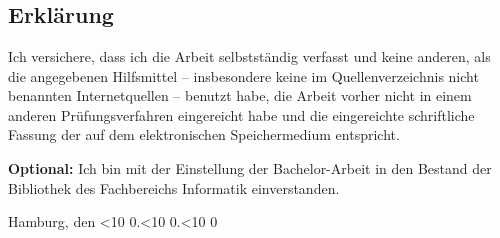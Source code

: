 \documentclass[
	12pt,
	a4paper,
	BCOR10mm,
	DIV14,
	listof=totoc,
	bibliography=totoc,
	headsepline
]{scrreprt}
\newcommand{\leadingzero}[1]{\ifnum #1<10 0\the#1\else\the#1\fi}
\begin{document}




\tableofcontents 				  %













\printbibliography


\listoffigures
\listoftables
\lstlistoflistings


\begin{appendices}

\end{appendices}

\newpage

\thispagestyle{empty}

\chapter*{}

\section*{Erklärung}

Ich versichere, dass ich die Arbeit selbstständig verfasst und keine anderen, als die angegebenen Hilfsmittel -- insbesondere keine im Quellenverzeichnis nicht benannten Internetquellen -- benutzt habe, die Arbeit vorher nicht in einem anderen Prüfungsverfahren eingereicht habe und die eingereichte schriftliche Fassung der auf dem elektronischen Speichermedium entspricht.

\smallskip

\textbf{Optional:} Ich bin mit der Einstellung der Bachelor-Arbeit in den Bestand der Bibliothek des Fachbereichs Informatik einverstanden.

\bigskip
\bigskip
\bigskip

Hamburg, den \leadingzero{\day}.\leadingzero{\month}.\leadingzero{\year} \quad \dotfill
\end{document}
